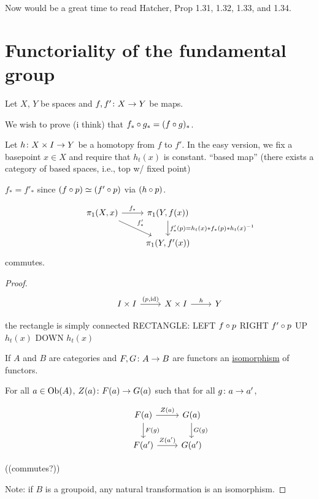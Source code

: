 \documentclass[11pt,leqno,oneside]{amsart}
\newenvironment{dateenv}{
  \vspace{1em}
}{
  \vspace{1em}
}
\newcommand{\mydate}[4]{
  \newdate{#1}{#2}{#3}{#4}
  \begin{dateenv}
    \hfill\displaydate{#1}
  \end{dateenv}
}
\numberwithin{thm}{section}
\newcommand{\homotopic}{\simeq}
\newcommand{\fund}[1][1]{\pi_{#1}}
\newcommand{\x}{\times}
\newcommand{\id}{\text{id}}
\begin{document}
\begin{rmk}
  Now would be a great time to read Hatcher, Prop 1.31, 1.32, 1.33, and 1.34.
\end{rmk}

\mydate{d4}{30}{1}{2017}

\section{Functoriality of the fundamental group}

Let $X$, $Y$ be spaces and $f,f' \colon X \to Y$ be maps.

We wish to prove (i think) that $f_* \circ g_* = (f \circ g)_*$.

Let $h\from X \x I \to Y$ be a homotopy from $f$ to $f'$.  In the easy version, we fix a basepoint $x \in X$ and require that $h_t(x)$ is constant. ``based map'' (there exists a category of based spaces, i.e., top w/ fixed point)

$f_* = f'_*$ since $(f \of p) \homotopic (f' \of p)$ via $(h \circ p)$.


\begin{thm}
  $$\begin{tikzcd}
    &\fund(X,x) \arrow[r, "f_*"] \arrow[rd, "f'_*"] &\fund(Y,f(x)) \arrow[d, "f_*'(p) = h_t(x) * f_*(p) * h_t(x)^{-1}"] \\
    & &\fund(Y, f'(x))
  \end{tikzcd}$$ commutes.
\end{thm}
\begin{proof}
  $$\begin{tikzcd}
    &I \x I \arrow[r, "(p{,}\id)"] &X \x I \arrow[r, "h"] &Y
  \end{tikzcd}$$

  the rectangle is simply connected RECTANGLE: LEFT $f \circ p$ RIGHT
  $f' \circ p$ UP $h_t(x)$ DOWN $h_t(x)$

  If $A$ and $B$ are categories and $F,G\colon A \to B$ are functors an \underline{isomorphism} of functors.

  For all $a \in \text{Ob}(A)$, $Z(a)\colon F(a) \to G(a)$ such that for all $g \colon a \to a'$,

  $$\begin{tikzcd}
    &F(a) \arrow[r, "Z(a)"] \arrow[d, "F(g)"] & G(a) \arrow[d, "G(g)"] \\
    &F(a') \arrow[r, "Z(a')"]                  & G(a')
  \end{tikzcd}$$

  ((commutes?))

  Note: if $B$ is a groupoid, any natural transformation is an isomorphism.
\end{proof}
\end{document}
